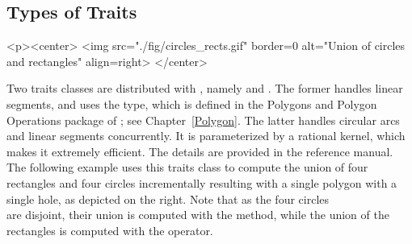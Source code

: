 \subsection{Types of Traits}
\label{bso_ssec:traits_types}
\lcTex{%
  \setlength{\widthRight}{2.4cm}
  \setlength{\widthLeft}{\widthLineReal}
  \addtolength{\widthLeft}{-\widthRight}
  \begin{minipage}{\widthLeft}
}
\label{fig:circle_recs}
\begin{ccHtmlOnly}
  <p><center>
    <img src="./fig/circles_rects.gif" border=0 alt="Union of circles
    and rectangles" align=right>
  </center>
\end{ccHtmlOnly}
Two traits classes are distributed with \cgal, namely 
 and . 
The former handles linear segments, and uses the  type,
which is defined in the Polygons and Polygon Operations package of 
\cgal; see Chapter~\ref{Polygon}. The latter handles circular arcs
and linear segments concurrently. It is parameterized by a rational 
kernel, which makes it extremely efficient. The details are provided in the 
reference manual. The following example uses this traits class to compute
the union of four rectangles and four circles incrementally resulting with 
a single polygon with a single hole, as depicted on the right. Note that as
the four circles
\\
are disjoint, their union is computed with the  method, 
while the union of the rectangles is computed with the  operator.

